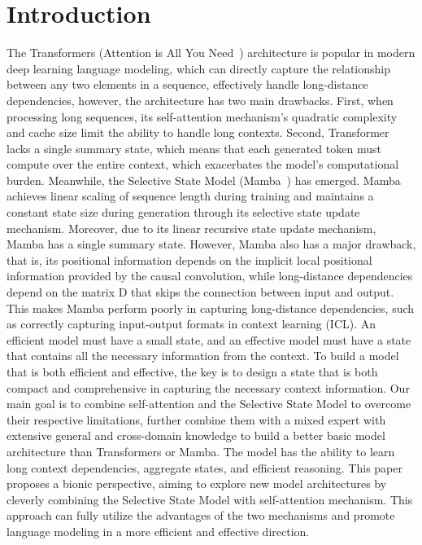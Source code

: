 \documentclass{article}
\theoremstyle{plain}
\theoremstyle{definition}
\theoremstyle{remark}
\begin{document}
\section{Introduction}
\label{submission}

The Transformers (Attention is All You Need~\cite{transformer2017}) architecture is popular in modern deep learning language modeling, which can directly capture the relationship between any two elements in a sequence, effectively handle long-distance dependencies, however, the architecture has two main drawbacks. First, when processing long sequences, its self-attention mechanism's quadratic complexity and cache size limit the ability to handle long contexts. Second, Transformer lacks a single summary state, which means that each generated token must compute over the entire context, which exacerbates the model's computational burden.
Meanwhile, the Selective State Model (Mamba~\cite{gu2023mamba}) has emerged. Mamba achieves linear scaling of sequence length during training and maintains a constant state size during generation through its selective state update mechanism. Moreover, due to its linear recursive state update mechanism, Mamba has a single summary state. However, Mamba also has a major drawback, that is, its positional information depends on the implicit local positional information provided by the causal convolution, while long-distance dependencies depend on the matrix D that skips the connection between input and output. This makes Mamba perform poorly in capturing long-distance dependencies, such as correctly capturing input-output formats in context learning (ICL).
An efficient model must have a small state, and an effective model must have a state that contains all the necessary information from the context. To build a model that is both efficient and effective, the key is to design a state that is both compact and comprehensive in capturing the necessary context information. Our main goal is to combine self-attention and the Selective State Model to overcome their respective limitations, further combine them with a mixed expert with extensive general and cross-domain knowledge to build a better basic model architecture than Transformers or Mamba. The model has the ability to learn long context dependencies, aggregate states, and efficient reasoning. This paper proposes a bionic perspective, aiming to explore new model architectures by cleverly combining the Selective State Model with self-attention mechanism. This approach can fully utilize the advantages of the two mechanisms and promote language modeling in a more efficient and effective direction.
\end{document}
